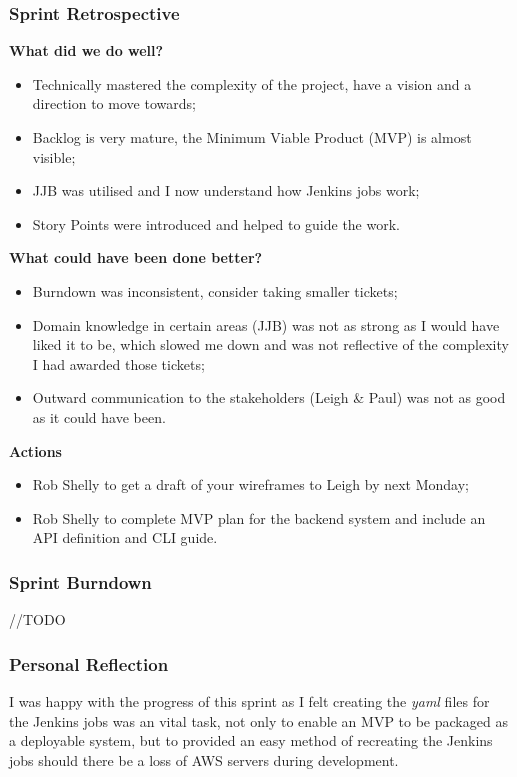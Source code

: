 		\subsubsection{Sprint Retrospective}
		\textbf{What did we do well?}
		\begin{itemize}	
			\item Technically mastered the complexity of the project, have a
			vision and a direction to move towards;
			\item Backlog is very mature, the Minimum Viable Product (MVP) is almost visible;
			\item JJB was utilised and I now understand how Jenkins jobs
			work;
			\item Story Points were introduced and helped to guide the work.
		\end{itemize}
		
		\noindent\textbf{What could have been done better?}
		\begin{itemize}
			\item Burndown was inconsistent, consider taking smaller tickets;
			\item Domain knowledge in certain areas (JJB) was not as strong
			as I would have liked it to be, which slowed me down and
			was not reflective of the complexity I had awarded those
			tickets;
			\item Outward communication to the stakeholders (Leigh \& Paul)
			was not as good as it could have been.
		\end{itemize}

		\noindent\textbf{Actions}
		\begin{itemize}
			\item Rob Shelly to get a draft of your wireframes to Leigh by next Monday;
			\item Rob Shelly to complete MVP plan for the backend system and include an API definition and CLI guide.
		\end{itemize}

		\subsubsection{Sprint Burndown}
		//TODO
		
		

		\subsubsection{Personal Reflection}
		I was happy with the progress of this sprint as I felt creating the \textit{yaml} files for the Jenkins jobs was an vital task, not only to enable an MVP to be packaged as a deployable system, but to provided an easy method of recreating the Jenkins jobs should there be a loss of AWS servers during development.
		
